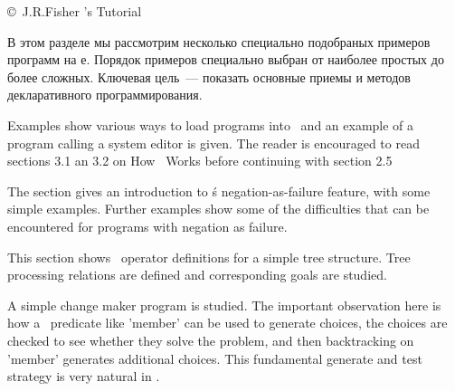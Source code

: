 \secdown

\copyright\ J.R.Fisher 's \prolog
Tutorial\ 

\bigskip





\label{fish2}\secdown

В этом разделе мы рассмотрим несколько специально подобраных примеров программ
на \prolog е. Порядок примеров специально выбран от наиболее простых до более
сложных. Ключевая цель\ --- показать основные приемы 
и методов декларативного программирования. 








Examples show various ways to load programs into \prolog\, and an example of a
program calling a system editor is given. The reader is encouraged to read
sections 3.1 an 3.2 on How \prolog\ Works before continuing with section 2.5
 

The section gives an introduction to \prolog\'s negation-as-failure feature, with
some simple examples. Further examples show some of the difficulties that can be
encountered for programs with negation as failure.


This section shows \prolog\ operator definitions for a simple tree structure. Tree
processing relations are defined and corresponding goals are studied.

 
 

A simple change maker program is studied. The important observation here is how
a \prolog\ predicate like 'member' can be used to generate choices, the choices
are checked to see whether they solve the problem, and then backtracking on
'member' generates additional choices. This fundamental generate and test
strategy is very natural in \prolog.


